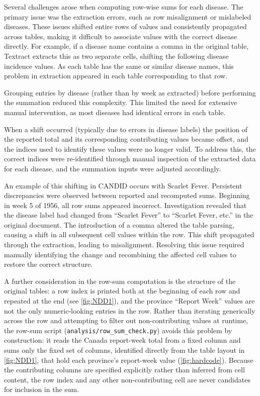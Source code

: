 \documentclass[12pt]{article}
\begin{document}
Several challenges arose when computing row-wise sums for each disease. The primary issue was the extraction errors, such as row misalignment or mislabeled diseases. These issues shifted entire rows of values and consistently propagated across tables, making it difficult to associate values with the correct disease directly. For example, if a disease name contains a comma in the original table, Textract extracts this as two separate cells, shifting the following disease incidence values. As each table has the same or similar disease names, this problem in extraction appeared in each table corresponding to that row. 

Grouping entries by disease (rather than by week as extracted) before performing the summation reduced this complexity. This limited the need for extensive manual intervention, as most diseases had identical errors in each table.

When a shift occurred (typically due to errors in disease labels) the position of the reported total and its corresponding contributing values became offset, and the indices used to identify these values were no longer valid. To address this, the correct indices were re-identified through manual inspection of the extracted data for each disease, and the summation inputs were adjusted accordingly.

An example of this shifting in CANDID occurs with Scarlet Fever. Persistent discrepancies were observed between reported and recomputed sums. Beginning in week 5 of 1956, all row sums appeared incorrect. Investigation revealed that the disease label had changed from ``Scarlet Fever'' to ``Scarlet Fever, etc.'' in the original document. The introduction of a comma altered the table parsing, causing a shift in all subsequent cell values within the row. This shift propagated through the extraction, leading to misalignment. Resolving this issue required manually identifying the change and recombining the affected cell values to restore the correct structure.

A further consideration in the row-sum computation is the structure of the original tables: a row index is printed both at the beginning of each row and repeated at the end (see \cref{fig:NDD1}), and the province ``Report Week'' values are not the only numeric-looking entries in the row. Rather than iterating generically across the row and attempting to filter out non-contributing values at runtime, the row-sum script (\texttt{analysis/row\_sum\_check.py}) avoids this problem by construction: it reads the Canada report-week total from a fixed column and sums only the fixed set of columns, identified directly from the table layout in \cref{fig:NDD1}, that hold each province's report-week value (\cref{fig:hardcode}). Because the contributing columns are specified explicitly rather than inferred from cell content, the row index and any other non-contributing cell are never candidates for inclusion in the sum.
\end{document}
